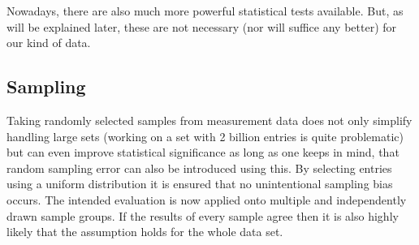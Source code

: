 Nowadays, there are also much more powerful statistical tests available. But, as will be explained later, these are not necessary (nor will suffice any better) for our kind of data.



\subsection{Sampling}
Taking randomly selected samples from measurement data does not only simplify handling large sets (working on a set with 2 billion entries is quite problematic) but can even improve statistical significance as long as one keeps in mind, that random sampling error can also be introduced using this.
By selecting entries using a uniform distribution it is ensured that no unintentional sampling bias occurs. The intended evaluation is now applied onto multiple and independently drawn sample groups. If the results of every sample agree then it is also highly likely that the assumption holds for the whole data set.

